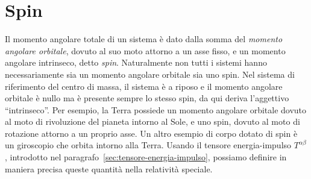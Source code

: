 \chapter{Spin}
\label{cha:spin}

Il momento angolare totale di un sistema è dato dalla somma del
\emph{momento angolare orbitale}, dovuto al suo moto attorno a un asse fisso, e
un momento angolare intrinseco, detto \emph{spin}.  Naturalmente non tutti i
sistemi hanno necessariamente sia un momento angolare orbitale sia uno spin.
Nel sistema di riferimento del centro di massa, il sistema è a riposo e il
momento angolare orbitale è nullo ma è presente sempre lo stesso spin, da qui
deriva l'aggettivo ``intrinseco''.  Per esempio, la Terra possiede un momento
angolare orbitale dovuto al moto di rivoluzione del pianeta intorno al Sole, e
uno spin, dovuto al moto di rotazione attorno a un proprio asse.  Un altro
esempio di corpo dotato di spin è un giroscopio che orbita intorno alla Terra.
Usando il tensore energia-impulso $T^{\alpha\beta}$, introdotto nel
paragrafo~\ref{sec:tensore-energia-impulso}, possiamo definire in maniera
precisa queste quantità nella relatività speciale.

